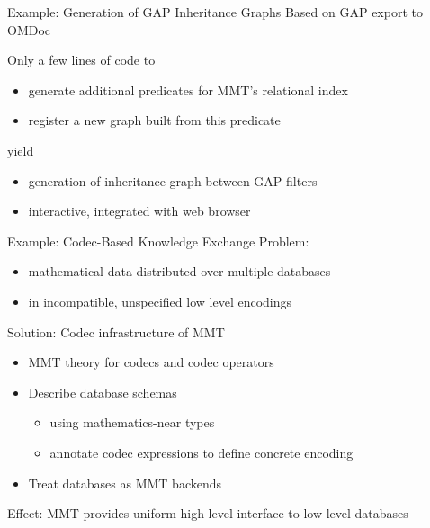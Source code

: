 \documentclass{beamer}
\begin{document}
\begin{myframe}{Example: Generation of GAP Inheritance Graphs}
Based on GAP export to OMDoc

Only a few lines of code to
\begin{itemize}
 \item generate additional predicates for MMT's relational index
 \item register a new graph built from this predicate
\end{itemize}
yield
\begin{itemize}
 \item generation of inheritance graph between GAP filters
 \item interactive, integrated with web browser
\end{itemize}
\end{myframe}

\begin{myframe}{Example: Codec-Based Knowledge Exchange}
Problem:
\begin{itemize}
  \item mathematical data distributed over multiple databases
  \item in incompatible, unspecified low level encodings
\end{itemize}

Solution: Codec infrastructure of MMT
\begin{itemize}
 \item MMT theory for codecs and codec operators
 \item Describe database schemas 
   \begin{itemize}
    \item using mathematics-near types
    \item annotate codec expressions to define concrete encoding
   \end{itemize}
 \item Treat databases as MMT backends
\end{itemize}
Effect: MMT provides uniform high-level interface to low-level databases
\end{myframe}
\end{document}
